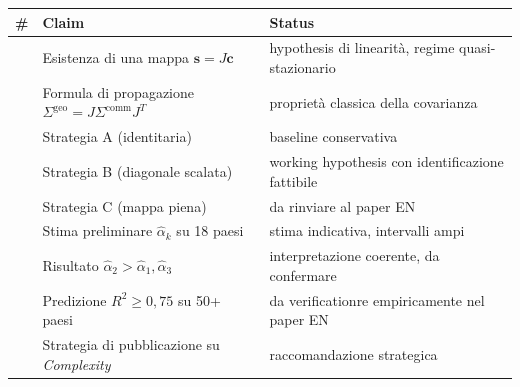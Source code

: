 {\def\LTcaptype{none} %
{\small\begin{longtable}[]{@{}
  >{\raggedright\arraybackslash}p{}
  >{\raggedright\arraybackslash}p{}
  >{\raggedright\arraybackslash}p{}@{}}
\toprule\noalign{}
\begin{minipage}[b]{\linewidth}\raggedright
\#
\end{minipage} & \begin{minipage}[b]{\linewidth}\raggedright
Claim
\end{minipage} & \begin{minipage}[b]{\linewidth}\raggedright
Status
\end{minipage} \\
\midrule\noalign{}
\endhead
\bottomrule\noalign{}
\endlastfoot
1 & Esistenza di una mappa \(\mathbf{s} = J \mathbf{c}\) & \Hypoth{}
hypothesis di linearità, regime quasi-stazionario \\
2 & Formula di propagazione
\(\Sigma^{\text{geo}} = J \Sigma^{\text{comm}} J^T\) & \Proved{}
proprietà classica della covarianza \\
3 & Strategia A (identitaria) & \Hypoth{} baseline conservativa \\
4 & Strategia B (diagonale scalata) & \Hypoth{} working hypothesis con
identificazione fattibile \\
5 & Strategia C (mappa piena) & \Conj{} da rinviare al paper EN \\
6 & Stima preliminare \(\hat\alpha_k\) su 18 paesi & \Conj{} stima
indicativa, intervalli ampi \\
7 & Risultato \(\hat\alpha_2 > \hat\alpha_1, \hat\alpha_3\) & \Hypoth{}
interpretazione coerente, da confermare \\
8 & Predizione \(R^2 \geq 0{,}75\) su 50+ paesi & \ToVerify{} da
verificationre empiricamente nel paper EN \\
9 & Strategia di pubblicazione su \emph{Complexity} & \Hypoth{}
raccomandazione strategica \\
\end{longtable}}
}


